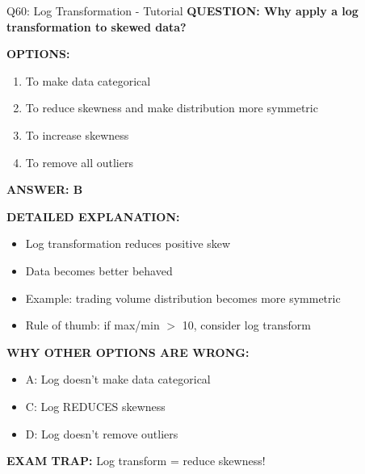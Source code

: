 \documentclass[8pt]{beamer}
\begin{document}
	\begin{frame}{Q60: Log Transformation - Tutorial}
		\fontsize{6.5}{7.5}\selectfont
		\textbf{QUESTION: Why apply a log transformation to skewed data?}
		
		\vspace{0.1cm}
		\textbf{OPTIONS:}
		\begin{enumerate}
			\item To make data categorical
			\item To reduce skewness and make distribution more symmetric
			\item To increase skewness
			\item To remove all outliers
		\end{enumerate}
		
		\vspace{0.1cm}
		\textcolor{myblue}{\textbf{ANSWER: B}}
		
		\vspace{0.1cm}
		\textbf{DETAILED EXPLANATION:}
		\begin{itemize}
			\item Log transformation reduces positive skew
			\item Data becomes better behaved
			\item Example: trading volume distribution becomes more symmetric
			\item Rule of thumb: if max/min $>$ 10, consider log transform
		\end{itemize}
		
		\vspace{0.1cm}
		\textcolor{myred}{\textbf{WHY OTHER OPTIONS ARE WRONG:}}
		\begin{itemize}
			\item \textcolor{myred}{A:} Log doesn't make data categorical
			\item \textcolor{myred}{C:} Log REDUCES skewness
			\item \textcolor{myred}{D:} Log doesn't remove outliers
		\end{itemize}
		
		\textcolor{myred}{\textbf{EXAM TRAP:}} Log transform = \textcolor{myblue}{reduce skewness}!
	\end{frame}
	
	
\end{document}

